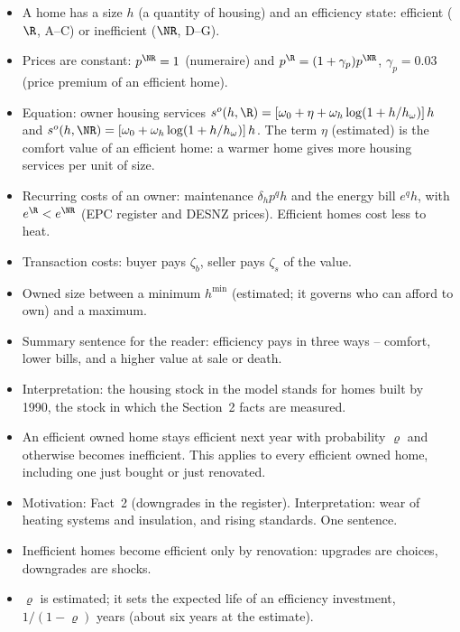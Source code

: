\begin{itemize}
  \item A home has a size $h$ (a quantity of housing) and an efficiency
    state: efficient ($\R$, A--C) or inefficient ($\NR$, D--G).
  \item Prices are constant: $p^{\NR}=1$ (numeraire) and
    $p^{\R}=(1+\gamma_p)p^{\NR}$, $\gamma_p=0.03$ (price premium of an
    efficient home).
  \item Equation: owner housing services
    $s^o(h,\R)=\left[\omega_0+\eta+\omega_h\log(1+h/h_\omega)\right]h$ and
    $s^o(h,\NR)=\left[\omega_0+\omega_h\log(1+h/h_\omega)\right]h$. The term
    $\eta$ (estimated) is the comfort value of an efficient home: a warmer
    home gives more housing services per unit of size.
  \item Recurring costs of an owner: maintenance $\delta_h p^q h$ and the
    energy bill $e^q h$, with $e^{\R}<e^{\NR}$ (EPC register and DESNZ
    prices). Efficient homes cost less to heat.
  \item Transaction costs: buyer pays $\zeta_b$, seller pays $\zeta_s$ of
    the value.
  \item Owned size between a minimum $h^{\min}$ (estimated; it governs who
    can afford to own) and a maximum.
  \item Summary sentence for the reader: efficiency pays in three ways --
    comfort, lower bills, and a higher value at sale or death.
  \item Interpretation: the housing stock in the model stands for homes
    built by 1990, the stock in which the Section~2 facts are measured.
\end{itemize}

\begin{itemize}
  \item An efficient owned home stays efficient next year with probability
    $\varrho$ and otherwise becomes inefficient. This applies to every
    efficient owned home, including one just bought or just renovated.
  \item Motivation: Fact~2 (downgrades in the register). Interpretation:
    wear of heating systems and insulation, and rising standards. One
    sentence.
  \item Inefficient homes become efficient only by renovation: upgrades are
    choices, downgrades are shocks.
  \item $\varrho$ is estimated; it sets the expected life of an efficiency
    investment, $1/(1-\varrho)$ years (about six years at the estimate).
\end{itemize}


